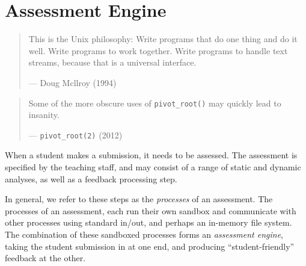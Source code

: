 
\chapter{Assessment Engine}

\label{section:assessment-engine}

\begin{quotation}

\footnotesize\sffamily\itshape

\begin{flushright}

This is the Unix philosophy: Write programs that do one thing and do it well.
Write programs to work together. Write programs to handle text streams, because
that is a universal interface.

\smallbreak

\upshape

--- Doug Mcllroy (1994)

\end{flushright}

\end{quotation}

\begin{quotation}

\footnotesize\sffamily\itshape

\begin{flushright}

Some of the more obscure uses of \texttt{pivot\_root()} may quickly lead to insanity.

\smallbreak

\upshape

--- \texttt{pivot\_root(2)} (2012)

\end{flushright}

\end{quotation}

When a student makes a submission, it needs to be assessed. The
assessment is specified by the teaching staff, and may consist of a range of
static and dynamic analyses, as well as a feedback processing step.

In general, we refer to these steps as the \emph{processes} of an assessment.
The processes of an assessment, each run their own sandbox and communicate with
other processes using standard in/out, and perhaps an in-memory file system.
The combination of these sandboxed processes forms an \emph{assessment engine},
taking the student submission in at one end, and producing ``student-friendly''
feedback at the other.

